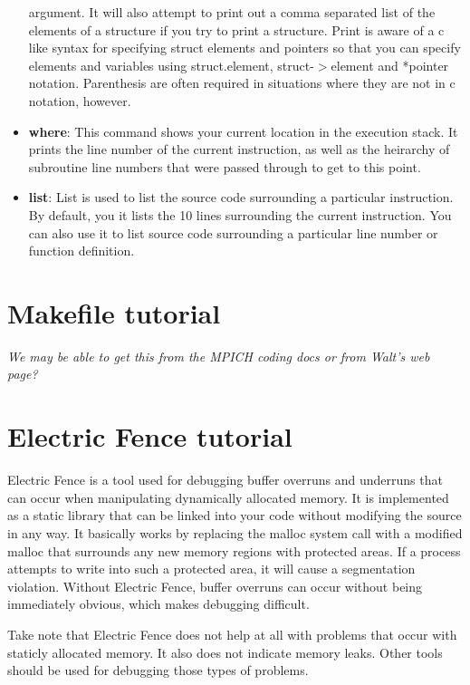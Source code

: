 \documentclass[11pt, letterpaper]{article}
\begin{document}
\begin{itemize}
argument.  It will also attempt to print out a comma separated list of
the elements of a structure if you try to print a structure.  Print is
aware of a c like syntax for specifying struct elements and pointers so
that you can specify elements and variables using struct.element,
struct-$>$element and *pointer notation.  Parenthesis are often required
in situations where they are not in c notation, however.
\item \textbf{where}:  This command shows your current location in the
execution stack.  It prints the line number of the current instruction,
as well as the heirarchy of subroutine line numbers that were passed
through to get to this point.
\item \textbf{list}:  List is used to list the source code surrounding a
particular instruction.  By default, you it lists the 10 lines
surrounding the current instruction.  You can also use it to list source
code surrounding a particular line number or function definition.
\end{itemize}

\section{Makefile tutorial}

\emph{We may be able to get this from the MPICH coding docs or from
Walt's web page?}

\section{Electric Fence tutorial}

Electric Fence is a tool used for debugging buffer overruns and
underruns that can occur when manipulating dynamically allocated memory.  It is implemented as a static library that can be linked
into your code without modifying the source in any way.  It basically
works by replacing the malloc system call with a modified malloc that
surrounds any new memory regions with protected areas.  If a process
attempts to write into such a protected area, it will cause a segmentation
violation.  Without Electric Fence, buffer overruns can occur without
being immediately obvious, which makes debugging difficult.

Take note that Electric Fence does not help at all with problems that
occur with staticly allocated memory.  It also does not indicate
memory leaks.  Other tools should be used for debugging those types of
problems.
\end{document}
